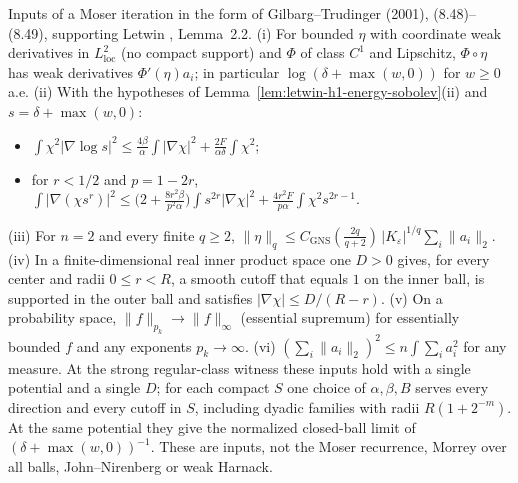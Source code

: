 \begin{lemma}
  \label{lem:letwin-moser-inputs}
  \leanok
  Inputs of a Moser iteration in the form of Gilbarg--Trudinger (2001), (8.48)--(8.49), supporting Letwin
  \cite{Letwin2026QuadraticKLS}, Lemma~2.2.
  (i) For bounded $\eta$ with coordinate weak derivatives in $L^2_{\mathrm{loc}}$ (no compact support) and $\Phi$ of class
  $C^1$ and Lipschitz, $\Phi\circ\eta$ has weak derivatives $\Phi'(\eta)a_i$; in particular $\log(\delta+\max(w,0))$ for
  $w\ge0$ a.e.
  (ii) With the hypotheses of Lemma~\ref{lem:letwin-h1-energy-sobolev}(ii) and $s=\delta+\max(w,0)$:
  \begin{itemize}
    \item $\int\chi^2|\nabla\log s|^2\le\frac{4\beta}{\alpha}\int|\nabla\chi|^2+\frac{2F}{\alpha\delta}\int\chi^2$;
    \item for $r<1/2$ and $p=1-2r$, $\int|\nabla(\chi s^r)|^2\le\bigl(2+\frac{8r^2\beta}{p^2\alpha}\bigr)\int s^{2r}|\nabla\chi|^2
      +\frac{4r^2F}{p\alpha}\int\chi^2s^{2r-1}$.
  \end{itemize}
  (iii) For $n=2$ and every finite $q\ge2$,
  $\|\eta\|_q\le C_{\mathrm{GNS}}(\tfrac{2q}{q+2})\,|K_\varepsilon|^{1/q}\sum_i\|a_i\|_2$.
  (iv) In a finite-dimensional real inner product space one $D>0$ gives, for every center and radii $0\le r<R$, a smooth cutoff
  that equals $1$ on the inner ball, is supported in the outer ball and satisfies $|\nabla\chi|\le D/(R-r)$.
  (v) On a probability space, $\|f\|_{p_k}\to\|f\|_\infty$ (essential supremum) for essentially bounded $f$ and any exponents
  $p_k\to\infty$.
  (vi) $(\sum_i\|a_i\|_2)^2\le n\int\sum_ia_i^2$ for any measure.
  At the strong regular-class witness these inputs hold with a single potential and a single $D$; for each compact $S$ one choice of
  $\alpha,\beta,B$ serves every direction and every cutoff in $S$, including dyadic families with radii $R(1+2^{-m})$.
  At the same potential they give the normalized closed-ball limit of $(\delta+\max(w,0))^{-1}$.
  These are inputs, not the Moser recurrence, Morrey over all balls, John--Nirenberg or weak Harnack.
\end{lemma}
